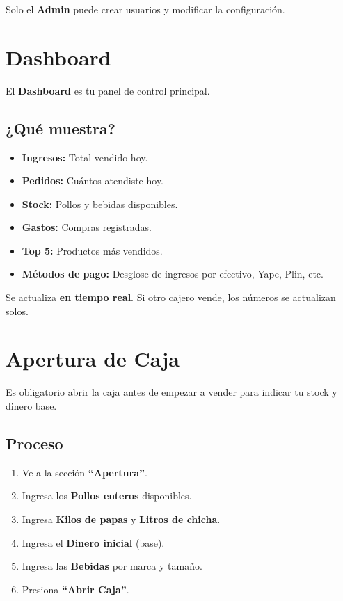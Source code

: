 \documentclass[10pt,a4paper,twoside]{article}
\begin{document}
\begin{warningbox}
Solo el \textbf{Admin} puede crear usuarios y modificar la configuración.
\end{warningbox}

\section{Dashboard}

El \textbf{Dashboard} es tu panel de control principal.

\subsection{¿Qué muestra?}
\begin{itemize}[itemsep=1pt, leftmargin=15pt]
    \item \textbf{Ingresos:} Total vendido hoy.
    \item \textbf{Pedidos:} Cuántos atendiste hoy.
    \item \textbf{Stock:} Pollos y bebidas disponibles.
    \item \textbf{Gastos:} Compras registradas.
    \item \textbf{Top 5:} Productos más vendidos.
    \item \textbf{Métodos de pago:} Desglose de ingresos por efectivo, Yape, Plin, etc.
\end{itemize}

\begin{tipbox}
Se actualiza \textbf{en tiempo real}. Si otro cajero vende, los números se actualizan solos.
\end{tipbox}

\section{Apertura de Caja}

Es obligatorio abrir la caja antes de empezar a vender para indicar tu stock y dinero base.

\subsection{Proceso}
\begin{stepbox}
\begin{enumerate}[itemsep=1pt, leftmargin=15pt]
    \item Ve a la sección \textbf{``Apertura''}.
    \item Ingresa los \textbf{Pollos enteros} disponibles.
    \item Ingresa \textbf{Kilos de papas} y \textbf{Litros de chicha}.
    \item Ingresa el \textbf{Dinero inicial} (base).
    \item Ingresa las \textbf{Bebidas} por marca y tamaño.
    \item Presiona \textbf{``Abrir Caja''}.
\end{enumerate}
\end{stepbox}
\end{document}
